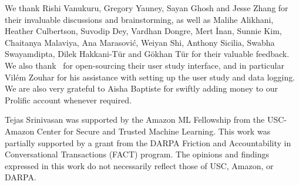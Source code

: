 We thank Rishi Vanukuru, Gregory Yauney, Sayan Ghosh and Jesse Zhang for their invaluable discussions and brainstorming, as well as Malihe Alikhani, Heather Culbertson, Suvodip Dey, Vardhan Dongre, Mert \.Inan, Sunnie Kim, Chaitanya Malaviya,  Ana Marasovi\'c, Weiyan Shi, Anthony Sicilia, Swabha Swayamdipta, Dilek Hakkani-T\"ur and G\"okhan T\"ur for their valuable feedback. 
We also thank~\citet{dhuliawala2023diachronic} for open-sourcing their user study interface, and in particular Vil\'em Zouhar for his assistance with setting up the user study and data logging. 
We are also very grateful to Aisha Baptiste for swiftly adding money to our Prolific account whenever required. 

Tejas Srinivasan was supported by the Amazon ML Fellowship from the USC-Amazon Center for Secure and Trusted Machine Learning. 
This work was partially supported by a grant from the DARPA Friction and Accountability in Conversational Transactions (FACT) program. 
The opinions and findings expressed in this work do not necessarily reflect those of USC, Amazon, or DARPA.